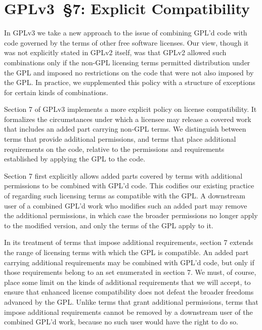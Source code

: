 \section{GPLv3~\S7: Explicit Compatibility}



In GPLv3 we take a new approach to the issue of combining GPL'd code with
code governed by the terms of other free software licenses. Our view, though
it was not explicitly stated in GPLv2 itself, was that GPLv2 allowed such
combinations only if the non-GPL licensing terms permitted distribution under
the GPL and imposed no restrictions on the code that were not also imposed by
the GPL. In practice, we supplemented this policy with a structure of
exceptions for certain kinds of combinations.


Section 7 of GPLv3 implements a more explicit policy on license
compatibility. It formalizes the circumstances under which a licensee may
release a covered work that includes an added part carrying non-GPL terms. We
distinguish between terms that provide additional permissions, and terms that
place additional requirements on the code, relative to the permissions and
requirements established by applying the GPL to the code.


Section 7 first explicitly allows added parts covered by terms with
additional permissions to be combined with GPL'd code. This codifies our
existing practice of regarding such licensing terms as compatible with the
GPL. A downstream user of a combined GPL'd work who modifies such an added
part may remove the additional permissions, in which case the broader
permissions no longer apply to the modified version, and only the terms of
the GPL apply to it.


In its treatment of terms that impose additional requirements, section 7
extends the range of licensing terms with which the GPL is compatible. An
added part carrying additional requirements may be combined with GPL'd code,
but only if those requirements belong to an set enumerated in section 7. We
must, of course, place some limit on the kinds of additional requirements
that we will accept, to ensure that enhanced license compatibility does not
defeat the broader freedoms advanced by the GPL. Unlike terms that grant
additional permissions, terms that impose additional requirements cannot be
removed by a downstream user of the combined GPL'd work, because no such user
would have the right to do so.

